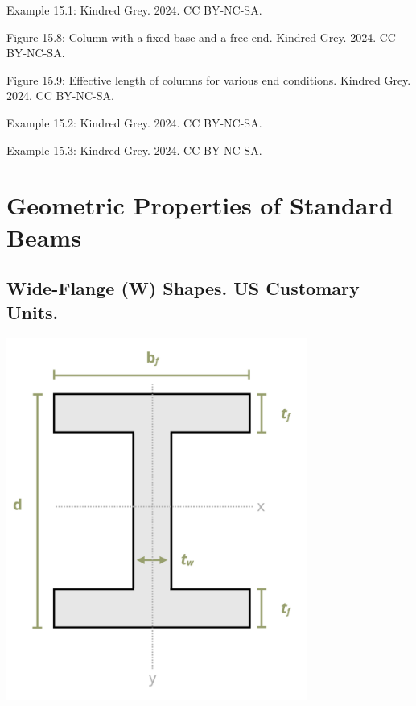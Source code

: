 \documentclass[
  letterpaper,
  DIV=11,
  numbers=noendperiod]{scrreprt}
\theoremstyle{definition}
\theoremstyle{remark}
\begin{document}
Example 15.1: Kindred Grey. 2024. CC BY-NC-SA.

Figure 15.8: Column with a fixed base and a free end. Kindred Grey.
2024. CC BY-NC-SA.

Figure 15.9: Effective length of columns for various end conditions.
Kindred Grey. 2024. CC BY-NC-SA.

Example 15.2: Kindred Grey. 2024. CC BY-NC-SA.

Example 15.3: Kindred Grey. 2024. CC BY-NC-SA.

\cleardoublepage
{}
{}
\appendix

\chapter{Geometric Properties of Standard
Beams}\label{sec-geometric-properties-of-standard-beams}

\section{Wide-Flange (W) Shapes. US Customary
Units.}\label{wide-flange-w-shapes.-us-customary-units.}

\includegraphics[width=3.89583in,height=\textheight]{images/Appendices/Appendix A part 1.png}
\end{document}
